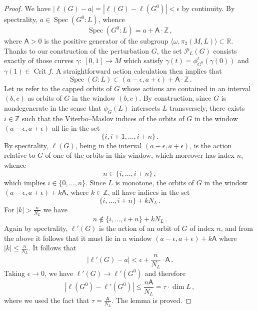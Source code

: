 \documentclass[10pt,a4paper]{amsart}
\DeclareMathOperator{\Crit}{Crit}
\DeclareMathOperator{\Spec}{Spec}
\newcommand{\R}{{\mathbb{R}}}
\newcommand{\Z}{{\mathbb{Z}}}
\newcommand{\cP}{{\mathcal{P}}}
\newcommand{\fc}{{:\ }}
\begin{document}
\begin{proof}
  We have $|\ell(G) - a| = |\ell(G) - \ell(G^0)| < \epsilon$ by continuity. By spectrality, $a \in \Spec(G^0:L)$, whence
  $$\Spec(G^0:L) = a + \mathsf A\cdot \Z\,,$$
  where $\mathsf A >0$ is the positive generator of the subgroup $\langle \omega,\pi_2(M,L)\rangle \subset \R$. Thanks to our construction of the perturbation $G$, the set $\cP_L(G)$ consists exactly of those curves $\gamma \fc [0,1] \to M$ which satisfy $\gamma(t) = \phi_{G^0}^t(\gamma(0))$ and $\gamma(1) \in \Crit f$. A straightforward action calculation then implies that
  $$\Spec(G:L) \subset (a-\epsilon,a+\epsilon) + \mathsf A \cdot \Z\,.$$
  Let us refer to the capped orbits of $G$ whose actions are contained in an interval $(b,c)$ as orbits of $G$ in the window $(b,c)$. By construction, since $G$ is nondegenerate in the sense that $\phi_G(L)$ intersects $L$ transversely, there exists $i \in \Z$ such that the Viterbo--Maslov indices of the orbits of $G$ in the window $(a-\epsilon,a+\epsilon)$ all lie in the set
  $$\{i,i+1,\dots,i+n\}\,.$$
  By spectrality, $\ell(G)$, being in the interval $(a-\epsilon,a+\epsilon)$, is the action relative to $G$ of one of the orbits in this window, which moreover has index $n$, whence
  $$n \in \{i,\dots,i+n\}\,,$$
  which implies $i \in \{0,\dots,n\}$. Since $L$ is monotone, the orbits of $G$ in the window $(a-\epsilon,a+\epsilon)+k\mathsf A$, where $k \in \Z$, all have indices in the set
  $$\{i,\dots,i+n\} + kN_L\,.$$
  For $|k|>\frac{n}{N_L}$ we have
  $$n \notin \{i,\dots,i+n\} + kN_L\,.$$
  Again by spectrality, $\ell'(G)$ is the action of an orbit of $G$ of index $n$, and from the above it follows that it must lie in a window $(a-\epsilon,a+\epsilon)+k\mathsf A$ where $|k|\leq \frac{n}{N_L}$. It follows that
  $$|\ell'(G) - a| < \epsilon + \frac{n}{N_L}\cdot\mathsf A\,.$$
  Taking $\epsilon \to 0$, we have $\ell'(G) \to \ell'(G^0)$ and therefore
  $$|\ell(G^0) - \ell'(G^0)| \leq \frac{n\mathsf A}{N_L}=\tau\cdot\dim L\,,$$
  where we used the fact that $\tau=\frac{\mathsf A}{N_L}$. The lemma is proved.
\end{proof}
\end{document}
